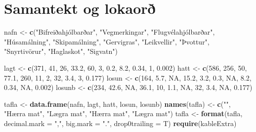 \documentclass[icelandic,]{book}
\newenvironment{Shaded}{\begin{snugshade}}{\end{snugshade}}
\newcommand{\DataTypeTok}[1]{\textcolor[rgb]{0.13,0.29,0.53}{#1}}
\newcommand{\DecValTok}[1]{\textcolor[rgb]{0.00,0.00,0.81}{#1}}
\newcommand{\FloatTok}[1]{\textcolor[rgb]{0.00,0.00,0.81}{#1}}
\newcommand{\KeywordTok}[1]{\textcolor[rgb]{0.13,0.29,0.53}{\textbf{#1}}}
\newcommand{\NormalTok}[1]{#1}
\newcommand{\OtherTok}[1]{\textcolor[rgb]{0.56,0.35,0.01}{#1}}
\newcommand{\StringTok}[1]{\textcolor[rgb]{0.31,0.60,0.02}{#1}}
\begin{document}
\hypertarget{samantekt-og-lokaor}{%
\section*{Samantekt og lokaorð}\label{samantekt-og-lokaor}}

\begin{Shaded}
\begin{Highlighting}[]
\NormalTok{nafn <-}\StringTok{ }\KeywordTok{c}\NormalTok{(}\StringTok{"Bifreiðahjólbarðar"}\NormalTok{, }\StringTok{"Vegmerkingar"}\NormalTok{, }\StringTok{"Flugvélahjólbarðar"}\NormalTok{, }\StringTok{"Húsamálning"}\NormalTok{, }\StringTok{"Skipamálning"}\NormalTok{, }\StringTok{"Gervigras"}\NormalTok{, }\StringTok{"Leikvellir"}\NormalTok{, }\StringTok{"Þvottur"}\NormalTok{, }\StringTok{"Snyrtivörur"}\NormalTok{, }\StringTok{"Haglaskot"}\NormalTok{, }
  \StringTok{"Sigvatn"}\NormalTok{)}

\NormalTok{lagt <-}\StringTok{ }\KeywordTok{c}\NormalTok{(}\DecValTok{371}\NormalTok{, }\DecValTok{41}\NormalTok{, }\DecValTok{26}\NormalTok{, }\FloatTok{33.2}\NormalTok{, }\DecValTok{60}\NormalTok{, }\DecValTok{3}\NormalTok{, }\FloatTok{0.2}\NormalTok{, }\FloatTok{8.2}\NormalTok{, }\FloatTok{0.34}\NormalTok{, }\DecValTok{1}\NormalTok{, }\FloatTok{0.002}\NormalTok{)}
\NormalTok{hatt <-}\StringTok{ }\KeywordTok{c}\NormalTok{(}\DecValTok{586}\NormalTok{, }\DecValTok{256}\NormalTok{, }\DecValTok{50}\NormalTok{, }\FloatTok{77.1}\NormalTok{, }\DecValTok{260}\NormalTok{, }\DecValTok{11}\NormalTok{, }\DecValTok{2}\NormalTok{, }\DecValTok{32}\NormalTok{, }\FloatTok{3.4}\NormalTok{, }\DecValTok{3}\NormalTok{, }\FloatTok{0.177}\NormalTok{)}
\NormalTok{losun <-}\StringTok{ }\KeywordTok{c}\NormalTok{(}\DecValTok{164}\NormalTok{, }\FloatTok{5.7}\NormalTok{, }\OtherTok{NA}\NormalTok{, }\FloatTok{15.2}\NormalTok{, }\FloatTok{3.2}\NormalTok{, }\FloatTok{0.3}\NormalTok{, }\OtherTok{NA}\NormalTok{, }\FloatTok{8.2}\NormalTok{, }\FloatTok{0.34}\NormalTok{, }\OtherTok{NA}\NormalTok{, }\FloatTok{0.002}\NormalTok{)}
\NormalTok{losunb <-}\StringTok{ }\KeywordTok{c}\NormalTok{(}\DecValTok{234}\NormalTok{, }\FloatTok{42.6}\NormalTok{, }\OtherTok{NA}\NormalTok{, }\FloatTok{36.1}\NormalTok{, }\DecValTok{10}\NormalTok{, }\FloatTok{1.1}\NormalTok{, }\OtherTok{NA}\NormalTok{, }\DecValTok{32}\NormalTok{, }\FloatTok{3.4}\NormalTok{, }\OtherTok{NA}\NormalTok{, }\FloatTok{0.177}\NormalTok{)}

\NormalTok{tafla <-}\StringTok{ }\KeywordTok{data.frame}\NormalTok{(nafn, lagt, hatt, losun, losunb)}
\KeywordTok{names}\NormalTok{(tafla) <-}\StringTok{ }\KeywordTok{c}\NormalTok{(}\StringTok{""}\NormalTok{, }\StringTok{"Hærra mat"}\NormalTok{, }\StringTok{"Lægra mat"}\NormalTok{, }\StringTok{"Hærra mat"}\NormalTok{, }\StringTok{"Lægra mat"}\NormalTok{)}
\NormalTok{tafla <-}\StringTok{ }\KeywordTok{format}\NormalTok{(tafla, }\DataTypeTok{decimal.mark =} \StringTok{","}\NormalTok{, }\DataTypeTok{big.mark =} \StringTok{"."}\NormalTok{, }\DataTypeTok{drop0trailing =}\NormalTok{ T)}
\KeywordTok{require}\NormalTok{(kableExtra)}


\end{Highlighting}
\end{Shaded}
\end{document}
